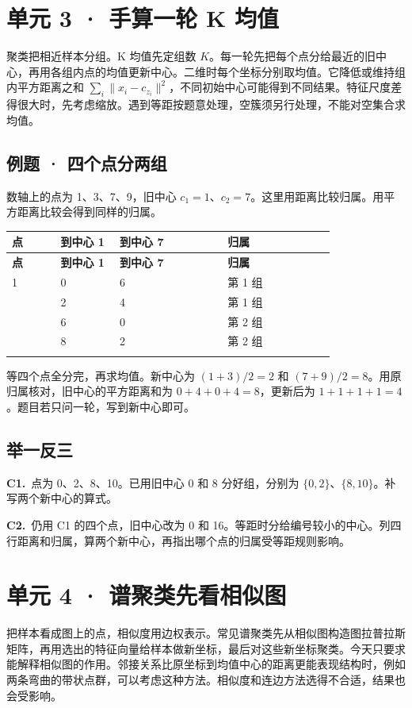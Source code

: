 \documentclass[UTF8,a4paper,11pt]{ctexart}
\newcommand{\PracticeQuestion}[3]{\par\Needspace{4\baselineskip}\noindent\begin{minipage}{\linewidth}\textbf{#1.}\ #2\par\noindent\rule{0pt}{#3mm}\par\end{minipage}\par}
\begin{document}
\section{单元 3 · 手算一轮 K 均值}
聚类把相近样本分组。K 均值先定组数 $K$。每一轮先把每个点分给最近的旧中心，再用各组内点的均值更新中心。二维时每个坐标分别取均值。它降低或维持组内平方距离之和 $\sum_i\|x_i-c_{z_i}\|^2$，不同初始中心可能得到不同结果。特征尺度差得很大时，先考虑缩放。遇到等距按题意处理，空簇须另行处理，不能对空集合求均值。

\subsection{例题 · 四个点分两组}
数轴上的点为 1、3、7、9，旧中心 $c_1=1$、$c_2=7$。这里用距离比较归属。用平方距离比较会得到同样的归属。

{\small\renewcommand{\arraystretch}{1.38}\setlength{\tabcolsep}{3.5pt}
\begin{longtable}{P{0.14\linewidth}P{0.17\linewidth}P{0.31\linewidth}P{0.31\linewidth}}
\toprule
\bfseries 点 & \bfseries 到中心 1 & \bfseries 到中心 7 & \bfseries 归属 \\
\midrule
\endfirsthead
\toprule
\bfseries 点 & \bfseries 到中心 1 & \bfseries 到中心 7 & \bfseries 归属 \\
\midrule
{} & 0 & 6 & 第 1 组 \\
 & 2 & 4 & 第 1 组 \\
 & 6 & 0 & 第 2 组 \\
 & 8 & 2 & 第 2 组 \\
\addlinespace[.35em]
\bottomrule
\end{longtable}
}
等四个点全分完，再求均值。新中心为 $(1+3)/2=2$ 和 $(7+9)/2=8$。用原归属核对，旧中心的平方距离和为 $0+4+0+4=8$，更新后为 $1+1+1+1=4$。题目若只问一轮，写到新中心即可。

\subsection{举一反三}
\PracticeQuestion{C1}{点为 0、2、8、10。已用旧中心 0 和 8 分好组，分别为 $\{0,2\}$、$\{8,10\}$。补写两个新中心的算式。}{27}
\PracticeQuestion{C2}{仍用 C1 的四个点，旧中心改为 0 和 16。等距时分给编号较小的中心。列四行距离和归属，算两个新中心，再指出哪个点的归属受等距规则影响。}{35}
\clearpage
\section{单元 4 · 谱聚类先看相似图}
把样本看成图上的点，相似度用边权表示。常见谱聚类先从相似图构造图拉普拉斯矩阵，再用选出的特征向量给样本做新坐标，最后对这些新坐标聚类。今天只要求能解释相似图的作用。邻接关系比原坐标到均值中心的距离更能表现结构时，例如两条弯曲的带状点群，可以考虑这种方法。相似度和连边方法选得不合适，结果也会受影响。
\end{document}
